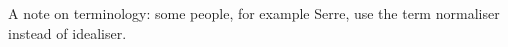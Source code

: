 A note on terminology: some people, for example Serre, use the term normaliser
instead of idealiser.
